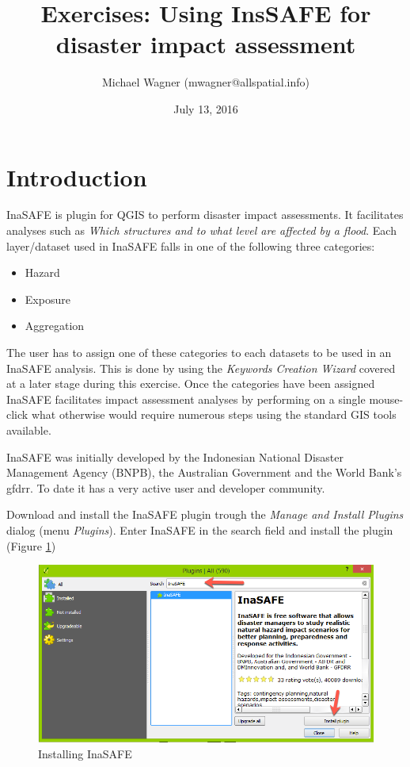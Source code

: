 \documentclass[a4paper,12pt,titlepage]{article}
\title{Exercises: Using InsSAFE for disaster impact assessment}
\author{Michael Wagner (mwagner@allspatial.info)}
\date{July 13, 2016}
\begin{document}
             										
\maketitle                   									

\tableofcontents
\listoffigures
\newpage
\printglossary[type=\acronymtype,title={List of Abbreviations}]
\newpage

\section{Introduction}

InaSAFE is plugin for QGIS to perform disaster impact assessments. It facilitates analyses such as \textit{Which structures and to what level are affected by a flood}. Each layer/dataset used in InaSAFE falls in one of the following three categories:

\begin{itemize}
	\item Hazard
	\item Exposure
	\item Aggregation 
\end{itemize}

The user has to assign one of these categories to each datasets to be used in an InaSAFE analysis. This is done by using the \textit{Keywords Creation Wizard} covered at a later stage during this exercise. Once the categories have been assigned InaSAFE facilitates impact assessment analyses by performing on a single mouse-click what otherwise would require numerous steps using the standard GIS tools available.

InaSAFE was initially developed by the Indonesian National Disaster Management Agency (BNPB), the Australian Government and the World Bank's \gls{gfdrr}. To date it has a very active user and developer community.

Download and install the InaSAFE plugin trough the \textit{Manage and Install Plugins} dialog (menu \textit{Plugins}). Enter InaSAFE in the search field and install the plugin (Figure \ref{fig:install_inasafe})

\begin{figure}[htb]
	\centering
	\includegraphics[width=12cm]{Images/install_inasafe.png}
	\caption{Installing InaSAFE}\label{fig:install_inasafe}
\end{figure}
\end{document}
